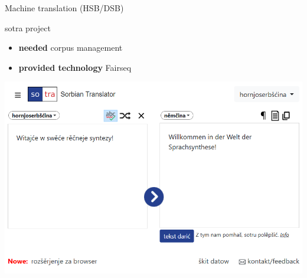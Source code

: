   \begin{block}{Machine translation (HSB/DSB)}

    sotra project

    \begin{itemize}
      \item \textbf{needed} corpus management
      \item \textbf{provided technology} Fairseq
    \end{itemize}

    \includegraphics[width=\colwidth]{sotra.png}

  \end{block}


